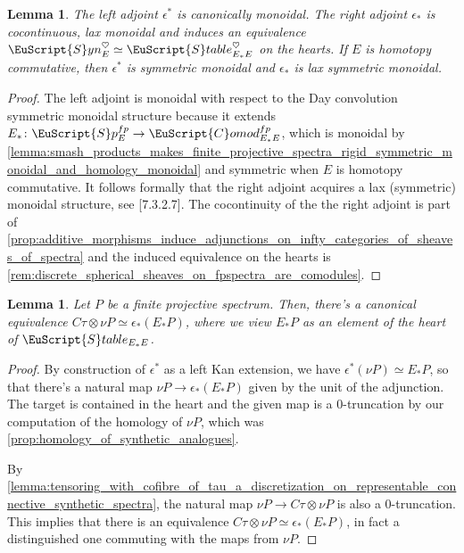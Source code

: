 \documentclass[oneside,a4paper]{amsart}
\newcommand{\euscr}[1]{\EuScript{#1}} %
\newcommand{\spectra}{\euscr{S}p} %
\newcommand{\stableE}{\euscr{S}table_{E_{*}E}} %
\newcommand{\synspectra}{\euscr{S}yn} %
\newcommand{\spectrafp}{\spectra_{E}^{fp}} %
\newcommand{\Comod}{\euscr{C}omod} %
\newcommand{\ComodE}{\Comod_{E_{*}E}} %
\theoremstyle{plain}
\newtheorem{lemma}[thm]{Lemma}
\theoremstyle{definition}
\theoremstyle{remark}
\begin{document}
\begin{lemma}
\label{lemma:all_properties_of_homology_functor_on_synthetic_spectra}
The left adjoint $\epsilon^{*}$ is canonically monoidal. The right adjoint $\epsilon_{*}$ is cocontinuous, lax monoidal and induces an equivalence $\synspectra_{E}^{\heartsuit} \simeq \stableE^{\heartsuit}$ on the hearts. If $E$ is homotopy commutative, then  $\epsilon^{*}$ is symmetric monoidal and $\epsilon_{*}$ is lax symmetric monoidal. 
\end{lemma}

\begin{proof}
The left adjoint is monoidal with respect to the Day convolution symmetric monoidal structure because it extends $E_{*} \colon \spectrafp \rightarrow \ComodE^{fp}$, which is monoidal by \cref{lemma:smash_products_makes_finite_projective_spectra_rigid_symmetric_monoidal_and_homology_monoidal} and symmetric when $E$ is homotopy commutative. It follows formally that the right adjoint acquires a lax (symmetric) monoidal structure, see \cite{higher_algebra}[7.3.2.7]. The cocontinuity of the the right adjoint is part of \cref{prop:additive_morphisms_induce_adjunctions_on_infty_categories_of_sheaves_of_spectra} and the induced equivalence on the hearts is \cref{rem:discrete_spherical_sheaves_on_fpspectra_are_comodules}.
\end{proof}

\begin{lemma}
\label{lemma:cofibre_of_tau_tensored_with_representable_equivalent_to_right_adjoint_of_its_homology_in_the_heart_of_hoveys_category}
Let $P$ be a finite projective spectrum. Then, there's a canonical equivalence $C\tau \otimes \nu P \simeq \epsilon_{*}(E_{*}P)$, where we view $E_{*}P$ as an element of the heart of $\stableE$. 
\end{lemma}

\begin{proof}
By construction of $\epsilon^{*}$ as a left Kan extension, we have $\epsilon^{*}(\nu P) \simeq E_{*}P$, so that there's a natural map $\nu P \rightarrow \epsilon_{*}(E_{*}P)$ given by the unit of the adjunction. The target is contained in the heart and the given map is a $0$-truncation by our computation of the homology of $\nu P$, which was \cref{prop:homology_of_synthetic_analogues}.

By \cref{lemma:tensoring_with_cofibre_of_tau_a_discretization_on_representable_connective_synthetic_spectra}, the natural map $\nu P \rightarrow C\tau \otimes \nu P$ is also a $0$-truncation. This implies that there is an equivalence $C\tau \otimes \nu P \simeq \epsilon_{*}(E_{*}P)$, in fact a distinguished one commuting with the maps from $\nu P$. 
\end{proof}
\end{document}
